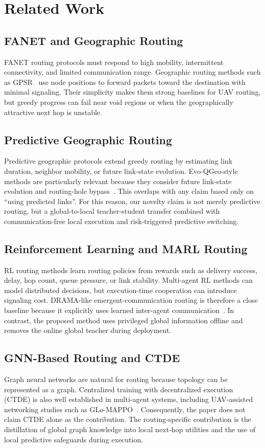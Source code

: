 \section{Related Work}
\label{sec:related_work}

\subsection{FANET and Geographic Routing}
FANET routing protocols must respond to high mobility, intermittent connectivity, and limited communication range. Geographic routing methods such as GPSR~\cite{gpsr} use node positions to forward packets toward the destination with minimal signaling. Their simplicity makes them strong baselines for UAV routing, but greedy progress can fail near void regions or when the geographically attractive next hop is unstable.

\subsection{Predictive Geographic Routing}
Predictive geographic protocols extend greedy routing by estimating link duration, neighbor mobility, or future link-state evolution. Evo-QGeo-style methods are particularly relevant because they consider future link-state evolution and routing-hole bypass~\cite{evoqgeo}. This overlaps with any claim based only on ``using predicted links''. For this reason, our novelty claim is not merely predictive routing, but a global-to-local teacher-student transfer combined with communication-free local execution and risk-triggered predictive switching.

\subsection{Reinforcement Learning and MARL Routing}
RL routing methods learn routing policies from rewards such as delivery success, delay, hop count, queue pressure, or link stability. Multi-agent RL methods can model distributed decisions, but execution-time cooperation can introduce signaling cost. DRAMA-like emergent-communication routing is therefore a close baseline because it explicitly uses learned inter-agent communication~\cite{drama}. In contrast, the proposed method uses privileged global information offline and removes the online global teacher during deployment.

\subsection{GNN-Based Routing and CTDE}
Graph neural networks are natural for routing because topology can be represented as a graph. Centralized training with decentralized execution (CTDE) is also well established in multi-agent systems, including UAV-assisted networking studies such as GLo-MAPPO~\cite{glo_mappo}. Consequently, the paper does not claim CTDE alone as the contribution. The routing-specific contribution is the distillation of global graph knowledge into local next-hop utilities and the use of local predictive safeguards during execution.

